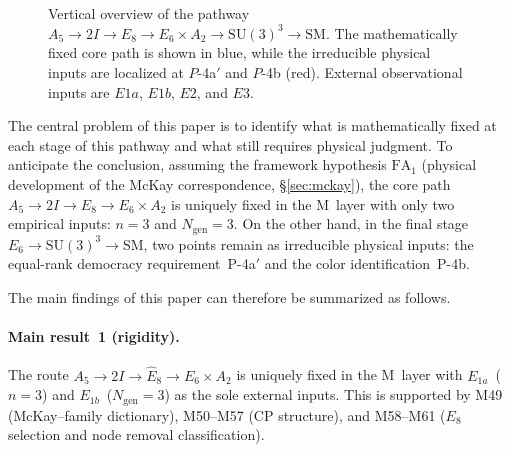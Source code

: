 \documentclass[sn-mathphys-num,Numbered]{sn-jnl}
\theoremstyle{thmstyleone}
\theoremstyle{thmstylethree}
\newcommand{\Ngen}{N_{\mathrm{gen}}}
\newcommand{\SU}{\mathrm{SU}}
\newcommand{\Ehat}{\hat{E}}
\begin{document}
\begin{figure}[t]
\caption{Vertical overview of the pathway $A_5\to 2I\to \Ehat_8\to E_6\times A_2\to \SU(3)^3\to \mathrm{SM}$. The mathematically fixed core path is shown in blue, while the irreducible physical inputs are localized at $P$-4a$'$ and $P$-4b (red). External observational inputs are $E1a$, $E1b$, $E2$, and $E3$.}
\label{fig:vertical_pathway}
\end{figure}


The central problem of this paper is to identify what is mathematically fixed
at each stage of this pathway and what still requires physical judgment.  To
anticipate the conclusion, assuming the framework hypothesis $\mathrm{FA}_1$
(physical development of the McKay correspondence, \S\ref{sec:mckay}), the
core path $A_5 \to 2I \to \Ehat_8 \to E_6 \times A_2$ is uniquely fixed in
the M~layer with only two empirical inputs: $n = 3$ and $\Ngen = 3$.  On the
other hand, in the final stage $E_6 \to \SU(3)^3 \to \text{SM}$, two points
remain as irreducible physical inputs: the equal-rank democracy
requirement~P-4a$'$ and the color identification~P-4b.

The main findings of this paper can therefore be summarized as follows.

\paragraph{Main result~1 (rigidity).}
The route $A_5 \to 2I \to \Ehat_8 \to E_6 \times A_2$ is uniquely fixed in
the M~layer with $E_{1a}$~($n=3$) and $E_{1b}$~($\Ngen = 3$) as the sole
external inputs.  This is supported by M49 (McKay--family dictionary),
M50--M57 (CP structure), and M58--M61 ($E_8$ selection and node removal
classification).
\end{document}
